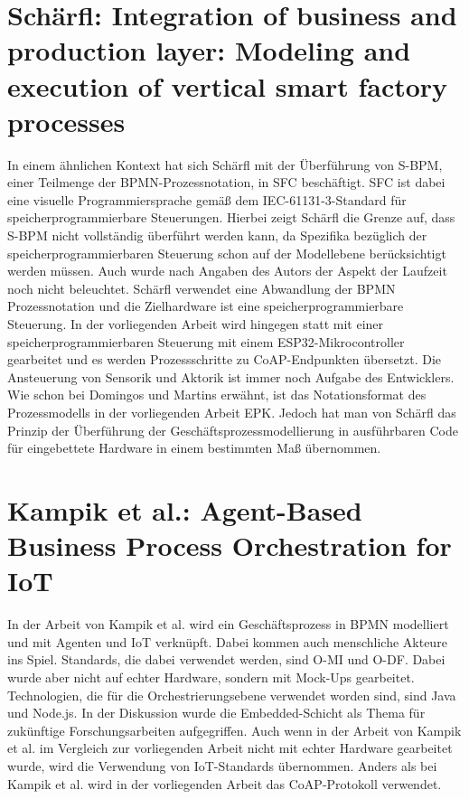 \newpage

\section{Schärfl: Integration of business and production layer: Modeling and execution of vertical smart factory processes}

\noindent In einem ähnlichen Kontext hat sich Schärfl mit der Überführung von \ac{S-BPM}, einer Teilmenge der BPMN-Prozessnotation, in \ac{SFC} beschäftigt. \ac{SFC} ist dabei eine visuelle Programmiersprache gemäß dem \ac{IEC}-61131-3-Standard für speicherprogrammierbare Steuerungen. Hierbei zeigt Schärfl die Grenze auf, dass S-BPM nicht vollständig überführt werden kann, da Spezifika bezüglich der speicherprogrammierbaren Steuerung schon auf der Modellebene berücksichtigt werden müssen. Auch wurde nach Angaben des Autors der Aspekt der Laufzeit noch nicht beleuchtet. \cite{schaerfl_integration_2016} Schärfl verwendet eine Abwandlung der BPMN Prozessnotation und die Zielhardware ist eine speicherprogrammierbare Steuerung. In der vorliegenden Arbeit wird hingegen statt mit einer speicherprogrammierbaren Steuerung mit einem ESP32-Mikrocontroller gearbeitet und es werden Prozessschritte zu CoAP-Endpunkten übersetzt. Die Ansteuerung von Sensorik und Aktorik ist immer noch Aufgabe des Entwicklers. Wie schon bei Domingos und Martins erwähnt, ist das Notationsformat des Prozessmodells in der vorliegenden Arbeit EPK. Jedoch hat man von Schärfl das Prinzip der Überführung der Geschäftsprozessmodellierung in ausführbaren Code für eingebettete Hardware in einem bestimmten Maß übernommen. 

\section{Kampik et al.: Agent-Based Business Process Orchestration for IoT}

\noindent In der Arbeit von Kampik et al. wird ein Geschäftsprozess in BPMN modelliert und mit Agenten und IoT verknüpft. Dabei kommen auch menschliche Akteure ins Spiel. Standards, die dabei verwendet werden, sind \ac{O-MI} und \ac{O-DF}. Dabei wurde aber nicht auf echter Hardware, sondern mit
Mock-Ups gearbeitet. Technologien, die für die Orchestrierungsebene verwendet worden sind, sind Java und Node.js.
In der Diskussion wurde die Embedded-Schicht als Thema für zukünftige Forschungsarbeiten aufgegriffen. \cite{kampik_agent-based_2019} Auch wenn in der Arbeit von Kampik et al. im Vergleich zur vorliegenden Arbeit nicht mit echter Hardware gearbeitet wurde, wird die Verwendung von IoT-Standards übernommen. Anders als bei Kampik et al. wird in der vorliegenden Arbeit das CoAP-Protokoll verwendet.

